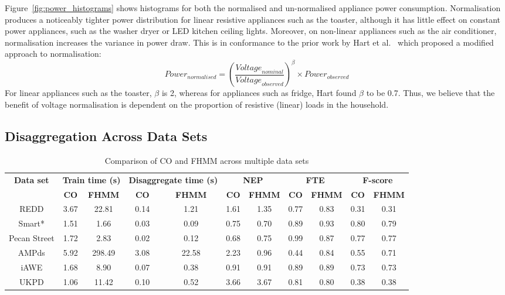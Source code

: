 \documentclass{sig-alternate}
\begin{document}
Figure~\ref{fig:power_histograms} shows
histograms for both the normalised and un-normalised appliance power
consumption. Normalisation produces a noticeably tighter power
distribution for linear resistive appliances such as the toaster, although it has
little effect on constant power appliances, such as the washer dryer or LED kitchen ceiling lights. Moreover, on non-linear appliances such as the air conditioner, normalisation increases the variance in power draw. This is in conformance to the prior work by Hart et al.~\cite{hart_1992} which proposed a modified approach to normalisation:
\begin{equation}
\textit{Power}_{\textit{normalised}} = 
\left(\frac{\textit{Voltage}_{\textit{nominal}}}{\textit{Voltage}_{\textit{observed}}}\right)^\beta
\times \textit{Power}_{\textit{observed}}
\end{equation}
For linear appliances such as the toaster, $\beta$ is 2, whereas for appliances such as fridge, Hart found $\beta$ to be 0.7. Thus, we believe that the benefit of voltage normalisation is dependent on the proportion of resistive (linear) loads in the household.

\subsection{Disaggregation Across Data Sets}

\begin{table}
\centering
\begin{tabular}{ccccccccccc}
\hline\textbf{Data set} & \multicolumn{2}{c}{\textbf{Train time (s)}}& \multicolumn{2}{c}{\textbf{Disaggregate time (s)}} &\multicolumn{2}{c}{\textbf{NEP}}    & \multicolumn{2}{c}{\textbf{FTE}} &\multicolumn{2}{c}{\textbf{F-score}} \\ 
~ &\textbf{CO} & \textbf{FHMM} &\textbf{CO} & \textbf{FHMM} &\textbf{CO} & \textbf{FHMM} &\textbf{CO} & \textbf{FHMM}&\textbf{CO} & \textbf{FHMM} \\ \hline 
REDD &3.67 &22.81 &0.14 &1.21 &1.61 &1.35 &0.77 &0.83 &0.31 &0.31\\ 
Smart* &1.51 &1.66 &0.03 &0.09 &0.75 &0.70 &0.89 &0.93 &0.80 &0.79\\ 
Pecan Street &1.72 &2.83 &0.02 &0.12 &0.68 &0.75 &0.99 &0.87 &0.77 &0.77\\ 
AMPds &5.92 &298.49 &3.08 &22.58 &2.23 &0.96 &0.44 &0.84 &0.55 &0.71\\ 
iAWE &1.68 &8.90 &0.07 &0.38 &0.91 &0.91 &0.89 &0.89 &0.73 &0.73\\ 
UKPD &1.06 &11.42 &0.10 &0.52 &3.66 &3.67 &0.81 &0.80 &0.38 &0.38\\
\hline
\end{tabular}
\caption{Comparison of CO and FHMM across multiple data sets}
\label{table:disaggregation}
\end{table}
\end{document}
